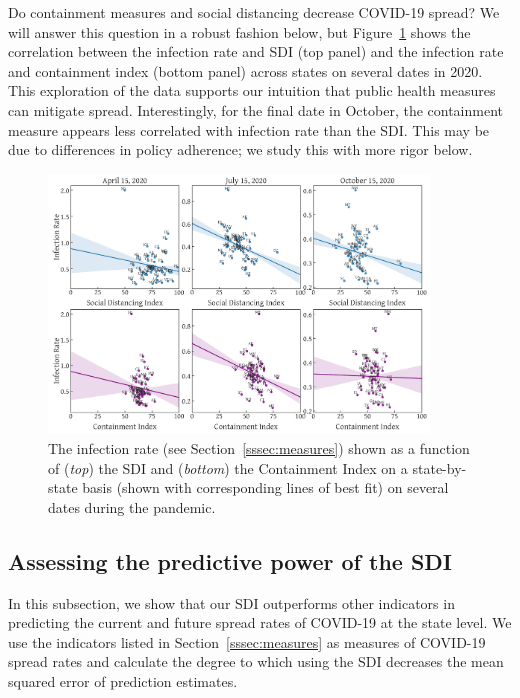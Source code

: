\documentclass[dvipsnames]{article}
\begin{document}
Do containment measures and social distancing decrease COVID-19 spread? We will answer this question in a robust fashion below, but Figure~\ref{fig:sdi_containment_vs_infection} shows the correlation between the infection rate and SDI (top panel) and the infection rate and containment index (bottom panel) across states on several dates in 2020. This exploration of the data supports our intuition that public health measures can mitigate spread. Interestingly, for the final date in October, the containment measure appears less correlated with infection rate than the SDI. This may be due to differences in policy adherence; we study this with more rigor below.
%
\begin{figure}[h!]
    \centering
    \includegraphics[width=0.9\textwidth]{sdi_containment_vs_infection.pdf}
    \caption{The infection rate (see Section~\ref{sssec:measures}) shown as a function of ({\it top}) the SDI and ({\it bottom}) the Containment Index on a state-by-state basis (shown with corresponding lines of best fit) on several dates during the pandemic.}
    \label{fig:sdi_containment_vs_infection}
\end{figure}

\subsection{Assessing the predictive power of the SDI}
\label{ssec:asso}

In this subsection, we show that our SDI outperforms other indicators in predicting the current and future spread rates of COVID-19 at the state level. We use the indicators listed in Section~\ref{sssec:measures} as measures of COVID-19 spread rates and calculate the degree to which using the SDI decreases the mean squared error of prediction estimates.
\end{document}

